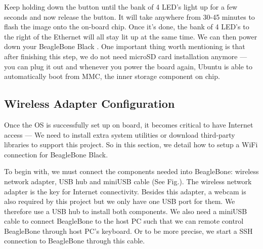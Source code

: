 \documentclass[12pt,journal,draftclsnofoot,onecolumn]{IEEEtran}
\begin{document}
Keep holding down the button until  the bank of 4 LED's light up for a few seconds and now release the button.
It will take anywhere from 30-45 minutes to flash the image onto the on-board chip. Once it's done, the bank of 4 LED's to the right of the Ethernet will all stay lit up at the same time. We can then power down your BeagleBone Black \cite{flashBB}. One important thing worth mentioning is that after finishing this step, we do not need microSD card installation anymore --- you can plug it out and whenever you power the board again, Ubuntu is able to automatically boot from MMC, the inner storage component on chip.
	
\subsection{Wireless Adapter Configuration}\label{Wireless}
Once the OS is successfully set up on board, it becomes critical to have Internet access --- We need to install extra system utilities or download third-party libraries to support this project. So in this section, we detail how to setup a WiFi connection for BeagleBone Black.

To begin with, we must connect the components needed into BeagleBone: wireless network adapter, USB hub and miniUSB cable (See Fig.). The wireless network adapter is the key for Internet connectivity. Besides this adapter, a webcam is also required by this project but we only have one USB port for them.  We therefore use a USB hub to install both components. We also need a miniUSB cable to connect BeagleBone to the host PC such that we can remote control BeagleBone through host PC's keyboard. Or to be more precise, we start a SSH connection to BeagleBone through this cable.
  
\end{document}
